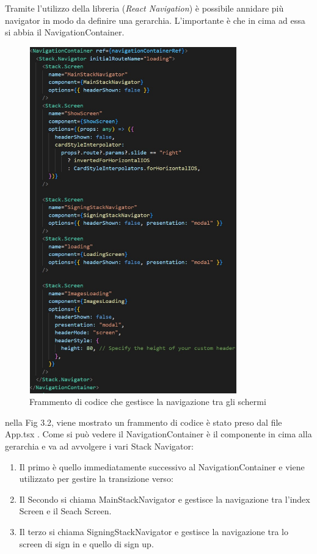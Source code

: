 Tramite l'utilizzo della libreria {}(\textit{React Navigation}) \`e possibile annidare pi\`u navigator in modo da definire una gerarchia. L'importante \`e che in cima ad essa si abbia il NavigationContainer.\\
\begin{figure}[h]
    \centering
    \includegraphics[width=9cm, height=15cm]{images/navigationCode.jpg}
    \caption[differenzeiteot]{Frammento di codice che gestisce la navigazione tra gli schermi}
    \label{fig:Navigation code}
\end{figure}

nella Fig 3.2, viene mostrato un frammento di codice \`e stato preso dal file App.tsx . Come si pu\`o vedere il NavigationContainer \`e il componente in cima alla gerarchia e va ad avvolgere i vari Stack Navigator:
\begin{enumerate}
    \item Il primo \`e quello immediatamente successivo al NavigationContainer e viene utilizzato per gestire la transizione verso:
    \item Il Secondo si chiama MainStackNavigator e gestisce la navigazione tra l'index Screen e il Seach Screen.
    \item Il terzo si chiama SigningStackNavigator e gestisce la navigazione tra lo screen di sign in e quello di sign up.
\end{enumerate}


